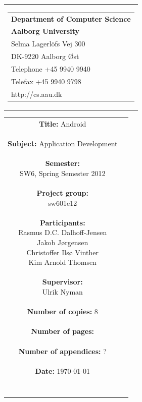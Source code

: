 \begin{nopagebreak}
\samepage 
\begin{tabular}{r}
\parbox{\textwidth}{
\hfill \parbox{6.2cm}{\begin{tabular}{l}
{\textsf\small \textbf{Department of Computer Science }}\\
{\textsf\small  \textbf{Aalborg University}}\\
{\textsf\small Selma Lagerlöfs Vej 300}\\
{\textsf\small DK-9220 Aalborg Øst}\\
{\textsf\small Telephone +45 9940 9940}\\
{\textsf\small Telefax +45 9940 9798}\\
{\textsf\small http://cs.aau.dk}
\end{tabular}}}
\end{tabular}

\begin{tabular}{cc}
\parbox{7cm}{
\textbf{Title:} 
Android\\ \\
\textbf{Subject:} 
Application Development \\ \\
\textbf{Semester:} \\
SW6, Spring Semester 2012\\ \\
\textbf{Project group:} \\
sw601e12\\ \\
\textbf{Participants:} \\
Rasmus D.C. Dalhoff-Jensen \\
Jakob J\o{}rgensen \\
Christoffer Ils\o{} Vinther \\
Kim Arnold Thomsen \\ \\
\textbf{Supervisor:} \\
Ulrik Nyman\\ \\
\textbf{Number of copies:}
8 \\ \\
\textbf{Number of pages:}
 \\ \\
\textbf{Number of appendices:}
? \\ \\
\textbf{Date:}
\today \\ \\ \\
}


\end{tabular}
\end{nopagebreak}
